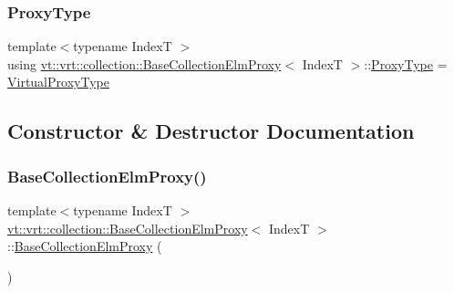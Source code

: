 \mbox{\label{structvt_1_1vrt_1_1collection_1_1_base_collection_elm_proxy_a1a60a46fe46552edfaf5c8785e283615}} 
\subsubsection{\texorpdfstring{Proxy\+Type}{ProxyType}}
{\footnotesize\ttfamily template$<$typename IndexT $>$ \\
using \hyperlink{structvt_1_1vrt_1_1collection_1_1_base_collection_elm_proxy}{vt\+::vrt\+::collection\+::\+Base\+Collection\+Elm\+Proxy}$<$ IndexT $>$\+::\hyperlink{structvt_1_1vrt_1_1collection_1_1_base_collection_elm_proxy_a1a60a46fe46552edfaf5c8785e283615}{Proxy\+Type} =  \hyperlink{namespacevt_a1b417dd5d684f045bb58a0ede70045ac}{Virtual\+Proxy\+Type}}



\subsection{Constructor \& Destructor Documentation}
\mbox{\label{structvt_1_1vrt_1_1collection_1_1_base_collection_elm_proxy_a8cc789eb47c9bdc35639eda026074037}} 
\subsubsection{\texorpdfstring{Base\+Collection\+Elm\+Proxy()}{BaseCollectionElmProxy()}\hspace{0.1cm}{\footnotesize\ttfamily [1/2]}}
{\footnotesize\ttfamily template$<$typename IndexT $>$ \\
\hyperlink{structvt_1_1vrt_1_1collection_1_1_base_collection_elm_proxy}{vt\+::vrt\+::collection\+::\+Base\+Collection\+Elm\+Proxy}$<$ IndexT $>$\+::\hyperlink{structvt_1_1vrt_1_1collection_1_1_base_collection_elm_proxy}{Base\+Collection\+Elm\+Proxy} (\begin{DoxyParamCaption}{ }\end{DoxyParamCaption})\hspace{0.3cm}{\ttfamily [default]}}

